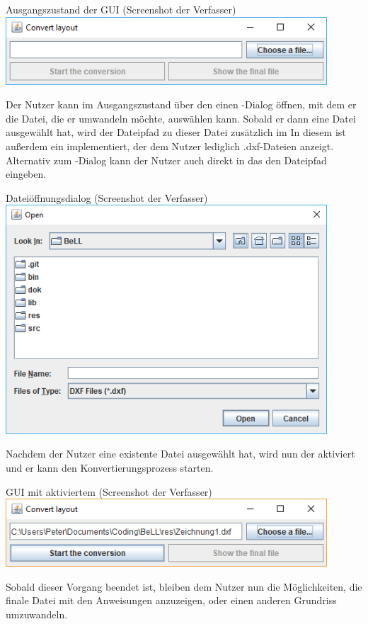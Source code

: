 \begin{Bild}{Ausgangszustand der GUI (Screenshot der Verfasser)}
	\includegraphics[width = 120mm]{Bilder/GUI_0}
\end{Bild}

Der Nutzer kann im Ausgangszustand über den  einen -Dialog öffnen, mit dem er die Datei, die er umwandeln möchte, auswählen kann.
Sobald er dann eine Datei ausgewählt hat, wird der Dateipfad zu dieser Datei zusätzlich im 
In diesem  ist außerdem ein  implementiert, der dem Nutzer lediglich .dxf-Dateien anzeigt.
Alternativ zum -Dialog kann der Nutzer auch direkt in das  den Dateipfad eingeben.

\begin{Bild}{Dateiöffnungsdialog (Screenshot der Verfasser)}
	\includegraphics[width = 120mm]{Bilder/GUI_1_FileSelect}
\end{Bild}

Nachdem der Nutzer eine existente Datei ausgewählt hat, wird nun der  aktiviert und er kann den Konvertierungsprozess starten.

\begin{Bild}{GUI mit aktiviertem  (Screenshot der Verfasser)}
	\includegraphics[width = 120mm]{Bilder/GUI_2_InProgress}
\end{Bild}

Sobald dieser Vorgang beendet ist, bleiben dem Nutzer nun die Möglichkeiten, die finale Datei mit den Anweisungen anzuzeigen, oder einen anderen Grundriss umzuwandeln.

